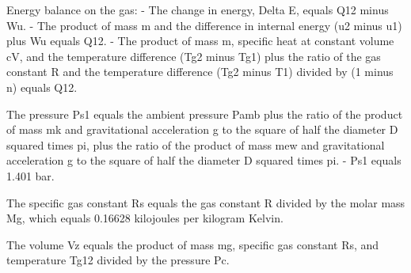 Energy balance on the gas:
- The change in energy, Delta E, equals Q12 minus Wu.
- The product of mass m and the difference in internal energy (u2 minus u1) plus Wu equals Q12.
- The product of mass m, specific heat at constant volume cV, and the temperature difference (Tg2 minus Tg1) plus the ratio of the gas constant R and the temperature difference (Tg2 minus T1) divided by (1 minus n) equals Q12.

The pressure Ps1 equals the ambient pressure Pamb plus the ratio of the product of mass mk and gravitational acceleration g to the square of half the diameter D squared times pi, plus the ratio of the product of mass mew and gravitational acceleration g to the square of half the diameter D squared times pi.
- Ps1 equals 1.401 bar.

The specific gas constant Rs equals the gas constant R divided by the molar mass Mg, which equals 0.16628 kilojoules per kilogram Kelvin.

The volume Vz equals the product of mass mg, specific gas constant Rs, and temperature Tg12 divided by the pressure Pc.